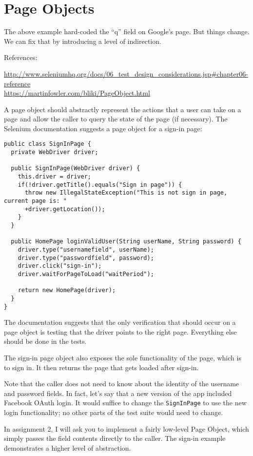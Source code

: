 \documentclass[11pt]{article}
\begin{document}
\section*{Page Objects}
The above example hard-coded the ``q'' field on Google's page.
But things change. We can fix that by introducing a level of
indirection.

References:

\url{http://www.seleniumhq.org/docs/06_test_design_considerations.jsp#chapter06-reference}\\
\url{https://martinfowler.com/bliki/PageObject.html}

A page object should abstractly represent the actions that
a user can take on a page and allow the caller to query
the state of the page (if necessary). The Selenium documentation
suggests a page object for a sign-in page:

\begin{lstlisting}
public class SignInPage {
  private WebDriver driver;

  public SignInPage(WebDriver driver) {
    this.driver = driver;
    if(!driver.getTitle().equals("Sign in page")) {
      throw new IllegalStateException("This is not sign in page, current page is: "
      +driver.getLocation());
    }
  }

  public HomePage loginValidUser(String userName, String password) {
    driver.type("usernamefield", userName);
    driver.type("passwordfield", password);
    driver.click("sign-in");
    driver.waitForPageToLoad("waitPeriod");

    return new HomePage(driver);
  }
}
\end{lstlisting}

The documentation suggests that the only verification that
should occur on a page object is testing that the driver
points to the right page. Everything else should be done in
the tests.

The sign-in page object also exposes the sole functionality of the
page, which is to sign in. It then returns the page that gets loaded
after sign-in.

Note that the caller does not need to know about the identity of the
username and password fields. In fact, let's say that a new version of
the app included Facebook OAuth login. It would suffice to change the
{\tt SignInPage} to use the new login functionality; no other parts of the test suite would need to change.

In assignment 2, I will ask you to implement a fairly low-level Page Object, which simply passes the field contents directly to the caller. The sign-in example demonstrates a higher level of abstraction.
\end{document}
